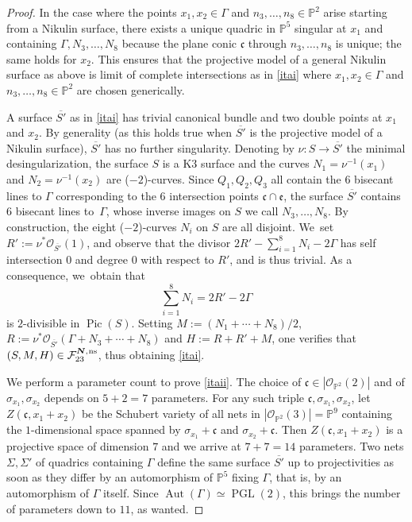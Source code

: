 \documentclass[JEP,XML,SOM,Unicode,NoEqCountersInSection,published]{cedram}
\newcommand{\ns}{{\mkern1mu\mathrm{ns}}}
\newcommand{\bN}{\boldsymbol{N}}
\theoremstyle{plain}
\theoremstyle{definition}
\DeclareMathOperator{\Aut}{Aut}
\DeclareMathOperator{\PGL}{PGL}
\DeclareMathOperator{\Pic}{Pic}
\newcommand\PP{{\mathbb P}}
\newcommand\F{{\mathcal F}}
\begin{document}
\begin{proof}
In the case where the points $x_1,x_2\in \Gamma$ and $n_3,\ldots,n_8 \in \PP^2$ arise starting from a Nikulin surface, there exists a unique quadric in $\PP^5$ singular at $x_1$ and containing $\Gamma, N_3,\ldots,N_8$ because the plane conic $\mathfrak{c}$ through $n_3,\ldots,n_8$ is unique; the same holds for $x_2$. This ensures that the projective model of a general Nikulin surface as above is limit of complete intersections as in \eqref{itai} where $x_1,x_2\in \Gamma$ and $n_3,\ldots,n_8 \in \PP^2$ are chosen generically.

A surface $\overline{S'}$ as in \eqref{itai} has trivial canonical bundle and two double points at $x_1$ and $x_2$. By generality (as this holds true when $\overline{S'}$ is the projective model of a Nikulin surface), $\overline{S'}$ has no further singularity. Denoting by $\nu:S\to \overline{S'}$ the minimal desingularization, the surface $S$ is a K3 surface and the curves $N_1=\nu^{-1}(x_1)$ and $N_2=\nu^{-1}(x_2)$ are ($-2$)-curves. Since $Q_1,Q_2,Q_3$ all contain the $6$ bisecant lines to $\Gamma$ corresponding to the $6$ intersection points $\mathfrak{c}\cap \mathfrak{e}$, the surface $\overline{S'}$ contains $6$ bisecant lines to~$\Gamma$, whose \hbox{inverse} images on $S$ we call $N_3,\ldots,N_8$. By construction, the eight ($-2$)\nobreakdash-curves $N_i$ on $S$ are all disjoint. We~set $R':=\nu^*\mathcal{O}_{\overline{S'}}(1)$, and observe that the divisor
$2R'-\sum_{i=1}^8N_i-2\Gamma$
has self intersection $0$ and degree $0$ with respect to $R'$, and is thus trivial. As a consequence, we~obtain that
\[
\sum_{i=1}^8N_i=2R'-2\Gamma
\]
is $2$-divisible in $\Pic(S)$. Setting $M:=(N_1+\cdots + N_8)/2$, $R:=\nu^*\mathcal{O}_{\overline{S'}}(\Gamma+N_3+\cdots+N_8)$ and $H:=R+R'+M$, one verifies that $(S,M,H)\in \F_{23}^{\bN,\ns}$, thus obtaining \eqref{itai}.

We perform a parameter count to prove \eqref{itaii}. The choice of $\mathfrak{c}\!\in\! |\mathcal O_{\PP^2}(2)|$ and of $\sigma_{x_1},\sigma_{x_2}$ depends on $5+2\!=\!7$ parameters. For any such triple $\mathfrak{c}, \sigma_{x_1},\sigma_{x_2}$, let \hbox{$Z(\mathfrak{c}, x_1\!+\!x_2)$} be the Schubert variety of all nets in $|\mathcal O_{\PP^2}(3)|=\PP^9$ containing the $1$-dimensional space spanned by $\sigma_{x_1}+\mathfrak{c}$ and $\sigma_{x_2}+\mathfrak{c}$. Then $Z(\mathfrak{c}, x_1+x_2)$ is a projective space of dimension $7$ and we arrive at $7+7=14$ parameters. Two nets $\Sigma,\Sigma'$ of quadrics containing $\Gamma$ define the same surface $\overline{S'}$ up to projectivities as soon as they differ by an automorphism of $\PP^5$ fixing $\Gamma$, that is, by an automorphism of $\Gamma$ itself. Since $\Aut(\Gamma)\simeq \PGL(2)$, this brings the number of parameters down to $11$, as wanted.
\end{proof}
\end{document}
